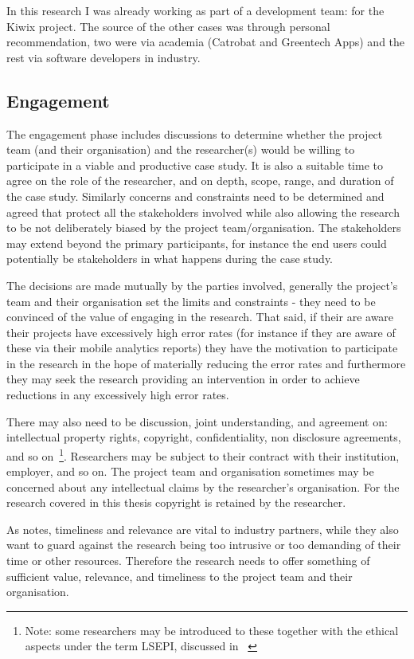 In this research I was already working as part of a development team: for the Kiwix project. The source of the other cases was through personal recommendation, two were via academia (Catrobat and Greentech Apps) and the rest via software developers in industry.

\subsection{Engagement}
The engagement phase includes discussions to determine whether the project team (and their organisation) and the researcher(s) would be willing to participate in a viable and productive case study. It is also a suitable time to agree on the role of the researcher, and on depth, scope, range, and duration of the case study. Similarly concerns and constraints need to be determined and agreed that protect all the stakeholders involved while also allowing the research to be not deliberately biased by the project team/organisation. The stakeholders may extend beyond the primary participants, for instance the end users could potentially be stakeholders in what happens during the case study.

The decisions are made mutually by the parties involved, generally the project's team and their organisation set the limits and constraints - they need to be convinced of the value of engaging in the research. That said, if their are aware their projects have excessively high error rates (for instance if they are aware of these via their mobile analytics reports) they have the motivation to participate in the research in the hope of materially reducing the error rates and furthermore they may seek the research providing an intervention in order to achieve reductions in any excessively high error rates. 

There may also need to be discussion, joint understanding, and agreement on: intellectual property rights, copyright, confidentiality, non disclosure agreements, and so on~\footnote{Note: some researchers may be introduced to these together with the ethical aspects under the term LSEPI, discussed in ~\citet{brooke2018__becoming_professional_a_university_perspective}}. Researchers may be subject to their contract with their institution, employer, and so on. The project team and organisation sometimes may be concerned about any intellectual claims by the researcher's organisation. For the research covered in this thesis copyright is retained by the researcher.

As \citet[p.324]{barroca_2018_bridging_the_gap} notes, timeliness and relevance are vital to industry partners, while they also want to guard against the research being too intrusive or too demanding of their time or other resources. Therefore the research needs to offer something of sufficient value, relevance, and timeliness to the project team and their organisation. 

